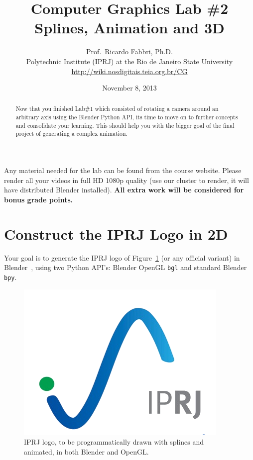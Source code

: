 \documentclass[a4paper]{article}
\begin{document}
\title{\textsf{Computer Graphics Lab \#2\\ Splines, Animation and 3D}
} 

\author{Prof.\ Ricardo Fabbri, Ph.D.\\[1em]
\small{Polytechnic Institute (IPRJ) at the Rio de Janeiro State University}\\
\small{\url{http://wiki.nosdigitais.teia.org.br/CG}}
}
 

\date{November 8, 2013}
\maketitle
\begin{abstract}
Now that you finished Lab\#1 which consisted of rotating a camera around an
arbitrary axis using the Blender Python API, its time to move on to further concepts and consolidate your
learning. This should help you with the bigger goal of the final project
of generating a complex animation.
\end{abstract}
\vspace{2em}

Any material needed for the lab can be found from the course
website. Please render all your videos in full HD 1080p quality (use our
cluster to render, it will have distributed Blender installed).
\textbf{All extra work will be considered for bonus grade points.}

\section{Construct the IPRJ Logo in 2D}
Your goal is to generate the IPRJ logo of Figure~\ref{fig:iprj:logo} (or any
official variant) in Blender~\cite{blender},
using two Python API's: Blender OpenGL \texttt{bgl} and standard Blender \texttt{bpy}. 
\begin{figure}
\centering
\includegraphics[width=0.5\linewidth]{figs/logo-iprj2.png}%
\caption{%
IPRJ logo, to be programmatically drawn with splines and animated, in both
Blender and OpenGL.
}\label{fig:iprj:logo}
\end{figure}
\end{document}
